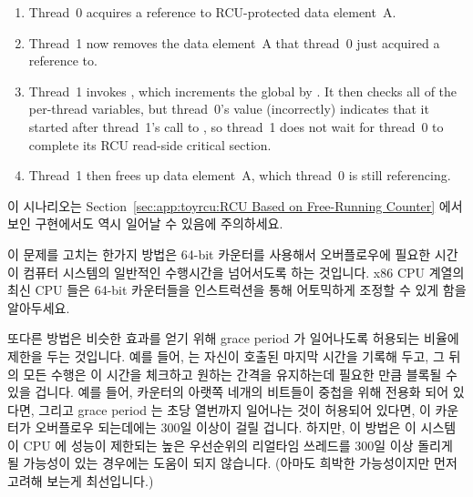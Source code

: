 {\begin{enumerate}
	\item	Thread~0 acquires a reference to RCU-protected data
		element~A.
	\item	Thread~1 now removes the data element~A that thread~0
		just acquired a reference to.
	\item	Thread~1 invokes , which
		increments the global  by
		.
		It then checks all of the per-thread 
		variables, but thread~0's value (incorrectly) indicates
		that it started after thread~1's call to
		, so thread~1 does not wait
		for thread~0 to complete its RCU read-side critical
		section.
	\item	Thread~1 then frees up data element~A, which thread~0
		is still referencing.
	\fi
	\end{enumerate}

	이 시나리오는
	Section~\ref{sec:app:toyrcu:RCU Based on Free-Running Counter} 에서 보인
	구현에서도 역시 일어날 수 있음에 주의하세요.

	이 문제를 고치는 한가지 방법은 64-bit 카운터를 사용해서 오버플로우에
	필요한 시간이 컴퓨터 시스템의 일반적인 수행시간을 넘어서도록 하는
	것입니다.
	x86 CPU 계열의 최신 CPU 들은 64-bit 카운터들을 
	인스트럭션을 통해 어토믹하게 조정할 수 있게 함을 알아두세요.
	\iffalse

	Note that scenario can also occur in the implementation presented in
	Section~\ref{sec:app:toyrcu:RCU Based on Free-Running Counter}.

	One strategy for fixing this problem is to use 64-bit
	counters so that the time required to overflow them would exceed
	the useful lifetime of the computer system.
	Note that non-antique members of the 32-bit x86 CPU family
	allow atomic manipulation of 64-bit counters via the
	\co{cmpxchg64b} instruction.
	\fi

	또다른 방법은 비슷한 효과를 얻기 위해 grace period 가 일어나도록
	허용되는 비율에 제한을 두는 것입니다.
	예를 들어,  는 자신이 호출된 마지막 시간을 기록해
	두고, 그 뒤의 모든 수행은 이 시간을 체크하고 원하는 간격을 유지하는데
	필요한 만큼 블록될 수 있을 겁니다.
	예를 들어, 카운터의 아랫쪽 네개의 비트들이 중첩을 위해 전용화 되어
	있다면, 그리고 grace period 는 초당 열번까지 일어나는 것이 허용되어
	있다면, 이 카운터가 오버플로우 되는데에는 300일 이상이 걸릴 겁니다.
	하지만, 이 방법은 이 시스템이 CPU 에 성능이 제한되는 높은 우선순위의
	리얼타임 쓰레드를 300일 이상 돌리게 될 가능성이 있는 경우에는 도움이
	되지 않습니다.
	(아마도 희박한 가능성이지만 먼저 고려해 보는게 최선입니다.)
	\iffalse

}
